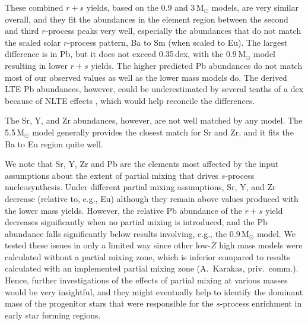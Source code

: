 \documentclass[twocolumn]{aastex63}
\begin{document}
These combined $r+s$ yields, based on the 0.9 and 3\,M$_{\odot}$ models, are very similar overall, and they fit the abundances in the element region between the second and third $r$-process peaks very well, especially the abundances that do not match the scaled solar $r$-process pattern, Ba to Sm (when scaled to Eu). The largest difference is in Pb, but it does not exceed 0.35\,dex, with the 0.9\,M$_{\odot}$ model resulting in lower $r+s$ yields. 
The higher predicted Pb abundances do not match most of our observed values as well as the lower mass models do. The derived LTE Pb abundances, however, could be underestimated by several tenths of a dex because of NLTE effects \citep{mashonkina12,roederer20}, which would help reconcile the differences.

The Sr, Y, and Zr abundances, however, are not well matched by any model.
The 5.5\,M$_{\odot}$ model generally provides the closest match for Sr and Zr, and it fits the Ba to Eu region quite well. 


We note that Sr, Y, Zr and Pb are the elements most affected by the input assumptions about the extent of partial mixing that drives $s$-process nucleosynthesis. Under different partial mixing assumptions, Sr, Y, and Zr decrease (relative to, e.g., Eu) although they remain above values produced with the lower mass yields. However, the relative Pb abundance of the $r+s$ yield decreases significantly when no partial mixing is introduced, and the Pb abundance falls significantly below results involving, e.g., the 0.9\,M$_{\odot}$ model. 
We tested these issues in only a limited way since other low-$Z$ high mass models were calculated without a partial mixing zone, which is inferior compared to results calculated with an implemented partial mixing zone (A.\ Karakas, priv.\ comm.). Hence, further investigations of the effects of partial mixing at various masses would be very insightful, and they might eventually help to identify the dominant mass of the progenitor stars that were responsible for the $s$-process enrichment in early star forming regions. 
\end{document}
